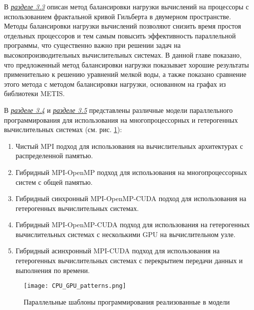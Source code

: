 В \underline{\textit{разделе 3.3}} описан метод балансировки нагрузки вычислений на процессоры с использованием фрактальной кривой Гильберта в двумерном пространстве.
Методы балансировки нагрузки вычислений позволяют снизить время простоя отдельных процессоров и тем самым повысить эффективность параллельной программы, что существенно важно при решении задач на высокопроизводительных вычислительных системах.
В данной главе показано, что предложенный метод балансировки нагрузки показывает хорошие результаты применительно к решению уравнений мелкой воды, а также показано сравнение этого метода с методом балансировки нагрузки, основанном на графах из библиотеки METIS.

В \underline{\textit{разделе 3.4}} и \underline{\textit{разделе 3.5}} представлены различные модели параллельного программирования для использования на многопроцессорных и гетерогенных вычислительных системах (см. рис. \ref{fig:patterns}):

\begin{enumerate}

\item Чистый MPI подход для использования на вычислительных архитектурах с распределенной памятью.
\item Гибридный MPI-OpenMP подход для использования на многопроцессорных систем с общей памя­тью.
\item Гибридный синхронный MPI-OpenMP-CUDA подход для использования на гетерогенных вычислительных системах.
\item Гибридный MPI-OpenMP-CUDA подход для использования на гетерогенных вычислительных системах с несколькими GPU на вычислительном узле.
\item Гибридный асинхронный MPI-CUDA подход для использования на гетерогенных вычислительных системах с перекрытием передачи данных и выполнения по времени.

\end{enumerate}

\begin{figure}[!ht]
	\texttt{[image: CPU\_GPU\_patterns.png]}
	\vspace{3pt}
	\caption{Параллельные шаблоны программирования реализованные в модели}
	\label{fig:patterns}
\end{figure}


